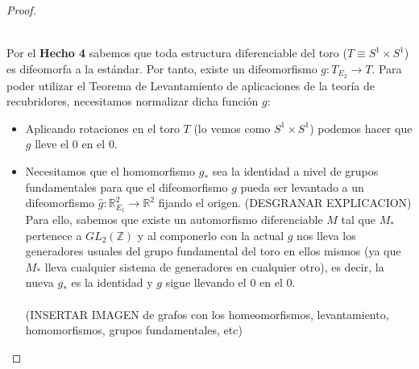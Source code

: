 \begin{proof}
\begin{enumerate}
			\\ Por el \textbf{Hecho 4} sabemos que toda estructura diferenciable del toro ($T \equiv S^1\times S^1$) es difeomorfa a la estándar. Por tanto, existe un difeomorfismo $g: T_{E_2} \rightarrow T$. Para poder utilizar el Teorema de Levantamiento de aplicaciones de la teoría de recubridores, necesitamos normalizar dicha función $g$:
			\begin{itemize}
				\item Aplicando rotaciones en el toro $T$ (lo vemos como $S^1\times S^1$) podemos hacer que $g$ lleve el $0$ en el $0$.
				\item Necesitamos que el homomorfismo $g_*$ sea la identidad a nivel de grupos fundamentales para que el difeomorfismo $g$ pueda ser levantado a un difeomorfismo $\widehat{g} : \mathbb{R}^2_{E_1} \rightarrow \mathbb{R}^2$ fijando el origen. (DESGRANAR EXPLICACION) Para ello, sabemos que existe un automorfismo diferenciable $M$ tal que $M_*$ pertenece a $GL_2(\mathbb{Z})$ y al componerlo con la actual $g$ nos lleva los generadores usuales del grupo fundamental del toro en ellos mismos (ya que $M_*$ lleva cualquier sistema de generadores en cualquier otro), es decir, la nueva $g_*$ es la identidad y $g$ sigue llevando el $0$ en el $0$. \\
				\\(INSERTAR IMAGEN de grafos con los homeomorfismos, levantamiento, homomorfismos, grupos fundamentales, etc)\\
			\end{itemize}
			 

\end{enumerate}
\end{proof}

